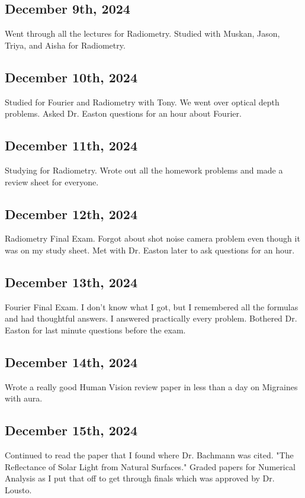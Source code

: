 \documentclass{article}
\begin{document}
\subsection{December 9th, 2024}
Went through all the lectures for Radiometry. 
Studied with Muskan, Jason, Triya, and Aisha for Radiometry. 


\subsection{December 10th, 2024}
Studied for Fourier and Radiometry with Tony. We went over optical depth problems. Asked Dr. Easton questions for an hour about Fourier. 

\subsection{December 11th, 2024}
Studying for Radiometry. Wrote out all the homework problems and made a review sheet for everyone. 

\subsection{December 12th, 2024}
Radiometry Final Exam. Forgot about shot noise camera problem even though it was on my study sheet. Met with Dr. Easton later to ask questions for an hour. 

\subsection{December 13th, 2024}
Fourier Final Exam. I don't know what I got, but I remembered all the formulas and had thoughtful answers. I answered practically every problem. Bothered Dr. Easton for last minute questions before the exam. 

\subsection{December 14th, 2024}
Wrote a really good Human Vision review paper in less than a day on Migraines with aura. 


\subsection{December 15th, 2024}

Continued to read the paper that I found where Dr. Bachmann was cited. "The Reflectance of Solar Light from Natural Surfaces." 
Graded papers for Numerical Analysis as I put that off to get through finals which was approved by Dr. Lousto. 
\end{document}
